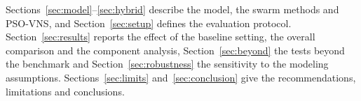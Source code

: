 Sections~\ref{sec:model}--\ref{sec:hybrid} describe the model, the swarm methods and PSO-VNS, and Section~\ref{sec:setup} defines the evaluation protocol. Section~\ref{sec:results} reports the effect of the baseline setting, the overall comparison and the component analysis, Section~\ref{sec:beyond} the tests beyond the benchmark and Section~\ref{sec:robustness} the sensitivity to the modeling assumptions. Sections~\ref{sec:limits} and~\ref{sec:conclusion} give the recommendations, limitations and conclusions.
